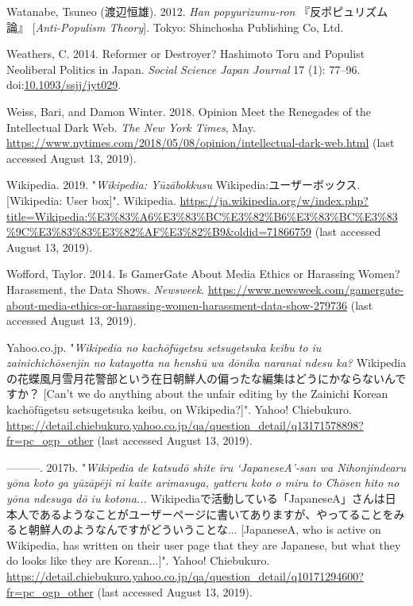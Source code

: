 \documentclass[10pt,british,A4paper,twoside]{memoir}
\begin{document}
\hypertarget{ref-watanabe_anti-populism_2012}{}
Watanabe, Tsuneo (渡辺恒雄). 2012. \emph{Han popyurizumu-ron} 『反ポピュリズム論』 [\emph{Anti-Populism Theory}]. Tokyo: Shinchosha
Publishing Co, Ltd.

\hypertarget{ref-weathers_reformer_2014}{}
Weathers, C. 2014. Reformer or Destroyer? Hashimoto Toru and Populist
Neoliberal Politics in Japan. \emph{Social Science Japan Journal} 17
(1): 77--96.
doi:\href{https://doi.org/10.1093/ssjj/jyt029}{10.1093/ssjj/jyt029}.

\hypertarget{ref-weiss_opinion_2018}{}
Weiss, Bari, and Damon Winter. 2018. Opinion Meet the Renegades of the
Intellectual Dark Web. \emph{The New York Times}, May.
\url{https://www.nytimes.com/2018/05/08/opinion/intellectual-dark-web.html} (last accessed August 13, 2019).

\hypertarget{ref-anonymous_wikipedia:_2019}{}
Wikipedia. 2019. "\emph{Wikipedia: Yūzābokkusu} Wikipedia:ユーザーボックス. [Wikipedia: User box]". Wikipedia.
\url{https://ja.wikipedia.org/w/index.php?title=Wikipedia:\%E3\%83\%A6\%E3\%83\%BC\%E3\%82\%B6\%E3\%83\%BC\%E3\%83\%9C\%E3\%83\%83\%E3\%82\%AF\%E3\%82\%B9\&oldid=71866759} (last accessed August 13, 2019).

\hypertarget{ref-wofford_is_2014}{}
Wofford, Taylor. 2014. Is GamerGate About Media Ethics or Harassing
Women? Harassment, the Data Shows. \emph{Newsweek}.
\url{https://www.newsweek.com/gamergate-about-media-ethics-or-harassing-women-harassment-data-show-279736} (last accessed August 13, 2019).

\hypertarget{ref-anonymous_cant_2017}{}
Yahoo.co.jp. "\emph{Wikipedia no kachōfūgetsu setsugetsuka keibu to iu zainichichōsenjin no katayotta na henshū wa dōnika naranai ndesu ka?} Wikipediaの花蝶風月雪月花警部という在日朝鮮人の偏ったな編集はどうにかならないんですか？ [Can't we do anything about the unfair editing by the Zainichi Korean kachōfūgetsu setsugetsuka keibu, on Wikipedia?]".
Yahoo! Chiebukuro.
\url{https://detail.chiebukuro.yahoo.co.jp/qa/question_detail/q13171578898?fr=pc_ogp_other} (last accessed August 13, 2019).

\hypertarget{ref-anonymous_japanesea_2017}{}
---------. 2017b. "\emph{Wikipedia de katsudō shite iru `JapaneseA'-san wa Nihonjindearu yōna koto ga yūzāpēji ni kaite arimasuga, yatteru koto o miru to Chōsen hito no yōna ndesuga dō iu kotona...} Wikipediaで活動している「JapaneseA」さんは日本人であるようなことがユーザーページに書いてありますが、やってることをみると朝鮮人のようなんですがどういうことな... [JapaneseA, who is active on Wikipedia, has written on their user page that they are Japanese, but what they do looks like they are Korean...]". Yahoo! Chiebukuro.
\url{https://detail.chiebukuro.yahoo.co.jp/qa/question_detail/q10171294600?fr=pc_ogp_other} (last accessed August 13, 2019).
\end{document}
